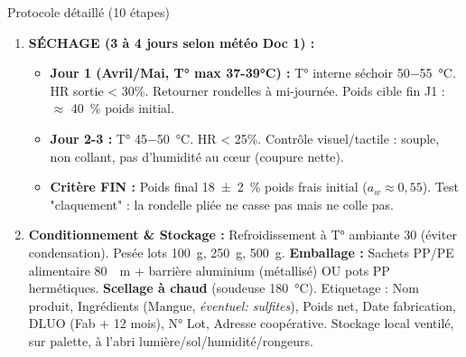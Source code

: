 \documentclass[11pt]{article}
\begin{document}
\begin{exoresolu}
\begin{methode}{Protocole détaillé (10 étapes)}
\begin{enumerate}
    \item \textbf{SÉCHAGE (3 à 4 jours selon météo Doc 1) :} 
    \begin{itemize}
        \item \textbf{Jour 1 (Avril/Mai, T° max 37-39°C) :} T° interne séchoir \SI{50-55}{\celsius}. HR sortie < 30\%. Retourner rondelles à mi-journée. Poids cible fin J1 : $\approx$ \SI{40}{\%} poids initial.
        \item \textbf{Jour 2-3 :} T° \SI{45-50}{\celsius}. HR < 25\%. Contrôle visuel/tactile : souple, non collant, pas d'humidité au cœur (coupure nette).
        \item \textbf{Critère FIN :} Poids final \SI{18 \pm 2}{\%} poids frais initial ($a_w \approx 0,55$). Test "claquement" : la rondelle pliée ne casse pas mais ne colle pas.
    \end{itemize}
    \item \textbf{Conditionnement \& Stockage :} Refroidissement à T° ambiante \SI{30}{\min} (éviter condensation). Pesée lots \SI{100}{g}, \SI{250}{g}, \SI{500}{g}. \textbf{Emballage :} Sachets PP/PE alimentaire \SI{80}{\mu m} + barrière aluminium (métallisé) OU pots PP hermétiques. \textbf{Scellage à chaud} (soudeuse \SI{180}{\celsius}). Etiquetage : Nom produit, Ingrédients (Mangue, \emph{éventuel: sulfites}), Poids net, Date fabrication, DLUO (Fab + 12 mois), N° Lot, Adresse coopérative. Stockage local ventilé, sur palette, à l'abri lumière/sol/humidité/rongeurs.
\end{enumerate}
\end{methode}


\end{exoresolu}
\end{document}
